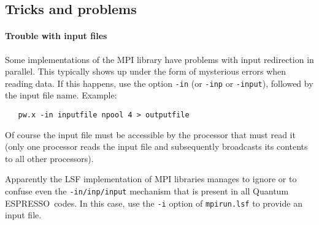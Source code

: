 \documentclass[12pt,a4paper]{article}
\def\qe{{\sc Quantum ESPRESSO}}
\begin{document}
\subsection{Tricks and problems}

\paragraph{Trouble with input files}
Some implementations of the MPI library have problems with input 
redirection in parallel. This typically shows up under the form of
mysterious errors when reading data. If this happens, use the option 
\texttt{-in} (or \texttt{-inp} or \texttt{-input}), followed by the input file name. 
Example:
\begin{verbatim}
   pw.x -in inputfile npool 4 > outputfile
\end{verbatim} 
Of course the 
input file must be accessible by the processor that must read it
(only one processor reads the input file and subsequently broadcasts
its contents to all other processors).

Apparently the LSF implementation of MPI libraries manages to ignore or to
confuse even the \texttt{-in/inp/input} mechanism that is present in all
\qe\ codes. In this case, use the \texttt{-i} option of \texttt{mpirun.lsf}
to provide an input file.
\end{document}
